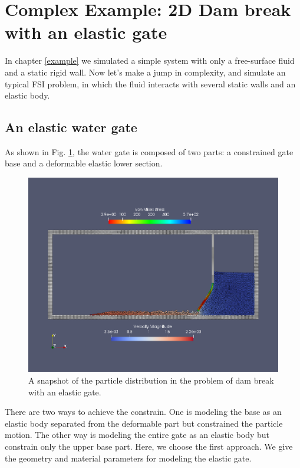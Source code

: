 \documentclass[12pt, a4paper,onecolumn]{article}
\begin{document}
\section{Complex Example: 2D Dam break with an elastic gate}\label{complex-example}
In chapter \ref{example} we simulated a simple system with only a free-surface fluid and a static rigid wall. Now let’s make a jump in complexity, and simulate an typical FSI problem, in which the fluid interacts with several static walls and an elastic body. 
%
\subsection{An elastic water gate}
As shown in Fig. \ref{figs:elastic-gate}, the water gate is composed of two parts:
a constrained gate base and a deformable elastic lower section.
%
\begin{figure}[tb!]
	\centering
	\includegraphics[width=\textwidth]{figs/elastic_gate.png}
	\caption{A snapshot of the particle distribution in the problem of dam break with an elastic gate. }
	\label{figs:elastic-gate}
\end{figure}
%
There are two ways to achieve the constrain. 
One is modeling the base as an elastic body separated from the deformable part 
but constrained the particle motion.
The other way is modeling the entire gate as an elastic body but constrain only the upper base part. 
Here, we choose the first approach.
We give the geometry and material parameters for modeling the elastic gate.
%
\end{document}
